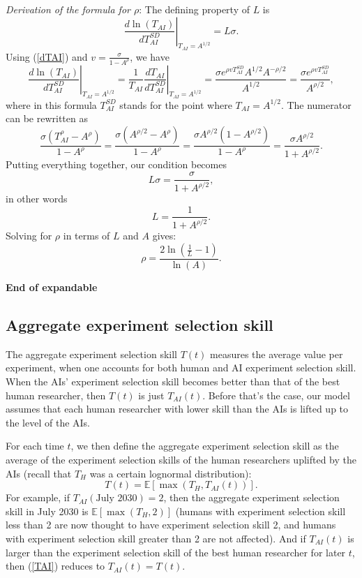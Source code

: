 \documentclass{article}
\theoremstyle{definition}
\newcommand{\ESUG}[1]{\textcolor{purple}{ELI-SUGGESTION: #1}}
\begin{document}
\textit{Derivation of the formula for $\rho$}: The defining property of $L$ is
\begin{equation} \label{L}
\left.\frac{d \ln(T_{AI})}{d T_{AI}^{SD}} \right|_{T_{AI} = A^{1/2}} = L \sigma.
\end{equation}
Using (\ref{dTAI}) and $v = \frac{\sigma}{1-A^\rho}$, we have
\[
\left. \frac{d \ln(T_{AI})}{d T_{AI}^{SD}}\right|_{T_{AI} = A^{1/2}} = \left.\frac{1}{T_{AI}}\frac{d T_{AI}}{d T_{AI}^{SD}} \right|_{T_{AI} = A^{1/2}} = \frac{\sigma e^{\rho v T_{AI}^{SD}} A^{1/2} A^{-\rho/2}}{A^{1/2}} = \frac{\sigma e^{\rho v T_{AI}^{SD}}}{A^{\rho/2}},
\]
where in this formula $T_{AI}^{SD}$ stands for the point where $T_{AI} = A^{1/2}$. The numerator can be rewritten as
\[ \frac{\sigma \left(T_{AI}^\rho - A^\rho\right)}{1-A^\rho} = \frac{\sigma \left(A^{\rho/2}-A^\rho\right)}{1-A^\rho} = \frac{\sigma A^{\rho/2} \left(1-A^{\rho/2}\right)}{1-A^\rho} = \frac{\sigma A^{\rho/2}}{1+A^{\rho/2}}.\]
Putting everything together, our condition becomes
\[ L \sigma = \frac{\sigma}{1+A^{\rho/2}},\]
in other words
\[ L = \frac{1}{1+A^{\rho/2}}.\]
Solving for $\rho$ in terms of $L$ and $A$ gives:
\[ \rho = \frac{2 \ln\left(\frac{1}{L}-1\right)}{\ln(A)}.\]





\textbf{End of expandable}

\subsection{Aggregate experiment selection skill} \label{Aggregate experiment selection skill}

The aggregate experiment selection skill $T(t)$ measures the average value per experiment, when one accounts for both human and AI experiment selection skill. When the AIs' experiment selection skill becomes better than that of the best human researcher, then $T(t)$ is just $T_{AI}(t)$. Before that's the case, our model assumes that each human researcher with lower skill than the AIs is lifted up to the level of the AIs.

For each time $t$, we then define the aggregate experiment selection skill as the average of the experiment selection skills of the human researchers uplifted by the AIs (recall that $T_H$ was a certain lognormal distribution):
\begin{equation} \label{TAI} 
T(t) = \mathbb{E} \left[ \max\left(T_H, T_{AI}(t)\right)\right].
\end{equation}
For example, if $T_{AI}(\text{July 2030}) = 2$, then the aggregate experiment selection skill in July 2030 is $\mathbb{E} \left[ \max \left(T_H, 2\right) \right]$ (humans with experiment selection skill less than 2 are now thought to have experiment selection skill 2, and humans with experiment selection skill greater than 2 are not affected). And if $T_{AI}(t)$ is larger than the experiment selection skill of the best human researcher for later $t$, then (\ref{TAI}) reduces to $T_{AI}(t) = T(t)$.
\end{document}
